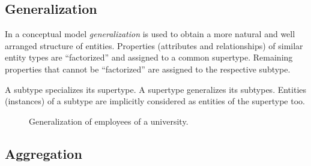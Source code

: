 
\subsection{Generalization}

In a conceptual model \emph{generalization} is used to obtain a more natural and well arranged structure of entities. Properties (attributes and relationships) of similar entity types are ``factorized'' and assigned to a common supertype.  Remaining properties that cannot be ``factorized'' are assigned to the respective subtype.

A subtype specializes its supertype. A supertype generalizes its subtypes. Entities (instances) of a subtype are implicitly considered as entities of the supertype too.

\begin{figure}[htbp]
\begin{center}
\end{center}
\caption[Generalization]{Generalization of employees of a university.}
\end{figure}




\subsection{Aggregation}

\todo

